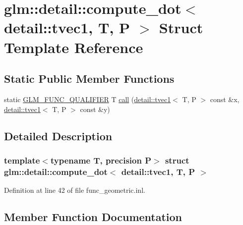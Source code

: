 \hypertarget{structglm_1_1detail_1_1compute__dot_3_01detail_1_1tvec1_00_01_t_00_01_p_01_4}{}\section{glm\+:\+:detail\+:\+:compute\+\_\+dot$<$ detail\+:\+:tvec1, T, P $>$ Struct Template Reference}
\label{structglm_1_1detail_1_1compute__dot_3_01detail_1_1tvec1_00_01_t_00_01_p_01_4}
\subsection*{Static Public Member Functions}
\begin{DoxyCompactItemize}
\item 
static \hyperlink{setup_8hpp_a33fdea6f91c5f834105f7415e2a64407}{G\+L\+M\+\_\+\+F\+U\+N\+C\+\_\+\+Q\+U\+A\+L\+I\+F\+I\+ER} T \hyperlink{structglm_1_1detail_1_1compute__dot_3_01detail_1_1tvec1_00_01_t_00_01_p_01_4_a8a857cb8e3ad91ffec9e5d2e8517be41}{call} (\hyperlink{structglm_1_1detail_1_1tvec1}{detail\+::tvec1}$<$ T, P $>$ const \&x, \hyperlink{structglm_1_1detail_1_1tvec1}{detail\+::tvec1}$<$ T, P $>$ const \&y)
\end{DoxyCompactItemize}


\subsection{Detailed Description}
\subsubsection*{template$<$typename T, precision P$>$\newline
struct glm\+::detail\+::compute\+\_\+dot$<$ detail\+::tvec1, T, P $>$}



Definition at line 42 of file func\+\_\+geometric.\+inl.



\subsection{Member Function Documentation}
\mbox{\label{structglm_1_1detail_1_1compute__dot_3_01detail_1_1tvec1_00_01_t_00_01_p_01_4_a8a857cb8e3ad91ffec9e5d2e8517be41}} 
